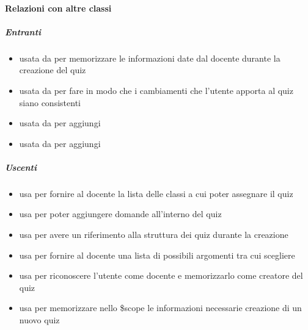 \paragraph{Relazioni con altre classi}
\subparagraph{Entranti}
\begin{itemize}
\item usata da  per memorizzare le informazioni date dal docente durante la creazione del quiz
\item usata da  per fare in modo che i cambiamenti che l'utente apporta al quiz siano consistenti
\item usata da  per aggiungi
\item usata da  per aggiungi
\end{itemize}
\subparagraph{Uscenti}
\begin{itemize}
\item usa  per fornire al docente la lista delle classi a cui poter assegnare il quiz
\item usa  per poter aggiungere domande all'interno del quiz
\item usa  per avere un riferimento alla struttura dei quiz durante la creazione
\item usa  per fornire al docente una lista di possibili argomenti tra cui scegliere
\item usa  per riconoscere l'utente come docente e memorizzarlo come creatore del quiz
\item usa  per memorizzare nello \$scope le informazioni necessarie creazione di un nuovo quiz
\end{itemize}
